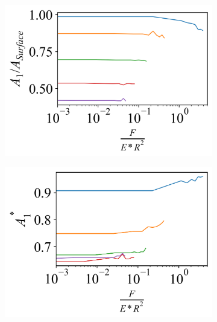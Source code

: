 \begin{figure}[ht]
    \begin{subfigure}[t]{0.325\textwidth}
        \centering
        \caption{\label{fig: Wave-Fourier True Component} }
        \includegraphics[width=1\linewidth]{Figures/Wave-Fourier4.png}
    \end{subfigure}    
    \hfill    
    \begin{subfigure}[t]{0.325\textwidth}
        \centering
        \caption{\label{fig: Wave-Fourier Relative Component} }
        \includegraphics[width=1\linewidth]{Figures/Wave-Fourier3.png}
    \end{subfigure}
    \hfill
    \begin{subfigure}[t]{0.325\textwidth}
        \centering
        \caption{\label{fig: Wave-FWHM-Fourier} }

\end{subfigure}
\end{figure}
